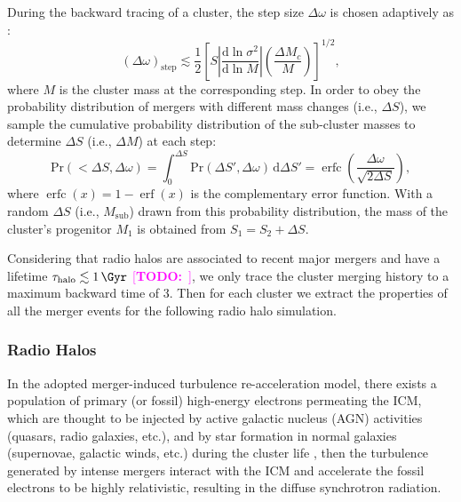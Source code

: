\documentclass[modern]{aastex62}
\newcommand{\R}[1]{\mathrm{#1}}
\newcommand{\D}[1]{\R{d} #1}
\newcommand{\diff}[2]{\frac{\D{#1}}{\D{#2}}}
\newcommand{\TODO}[1]{\textcolor{magenta}{[\textbf{TODO:}~\uuline{#1}]}}
\DeclareMathOperator{\erf}{erf}
\DeclareMathOperator{\erfc}{erfc}
\begin{document}
During the backward tracing of a cluster, the step size $\Delta\omega$
is chosen adaptively as \citep{randall2002}:
\begin{equation}
  \label{sec:dw-step}
  (\Delta\omega)_{\R{step}} \lesssim \frac{1}{2} \left[
    S \left| \diff{\ln \sigma^2}{\ln M} \right|
    \left( \frac{\Delta M_c}{M} \right) \right]^{1/2},
\end{equation}
where $M$ is the cluster mass at the corresponding step.
In order to obey the probability distribution of mergers with different
mass changes (i.e., $\Delta S$),
we sample the cumulative probability distribution of the sub-cluster masses
to determine $\Delta S$ (i.e., $\Delta M$) at each step:
\begin{equation}
  \label{sec:cdf-sub-masses}
  \R{Pr}(<\!\Delta S, \Delta\omega) =
  \int_0^{\Delta S} \R{Pr}(\Delta S', \Delta\omega) \,\D{\Delta S'} =
  \erfc \!\left( \frac{\Delta \omega}{\sqrt{2 \Delta S}} \right),
\end{equation}
where $\erfc(x) = 1 - \erf(x)$ is the complementary error function.
With a random $\Delta S$ (i.e., $M_{\R{sub}}$) drawn from this probability
distribution, the mass of the cluster's progenitor $M_1$ is obtained from
$S_1 = S_2 + \Delta S$.

Considering that radio halos are associated to recent major mergers and
have a lifetime $\tau_{\R{halo}} \lesssim \SI{1}{\Gyr}$
\citep{cassano2016} \TODO{change ref???},
we only trace the cluster merging history to a maximum backward time of
\SI{3}{\Gyr}.
Then for each cluster we extract the properties of all the merger events
for the following radio halo simulation.


\subsubsection{Radio Halos}
\label{sec:halos}

In the adopted merger-induced turbulence re-acceleration model, there
exists a population of primary (or fossil) high-energy electrons permeating
the ICM, which are thought to be injected by active galactic nucleus (AGN)
activities (quasars, radio galaxies, etc.), and by star formation in
normal galaxies (supernovae, galactic winds, etc.) during the cluster
life \citep[see][for a review]{blasi2007rev},
then the turbulence generated by intense mergers interact with the ICM
and accelerate the fossil electrons to be highly relativistic, resulting
in the diffuse synchrotron radiation.
\end{document}
